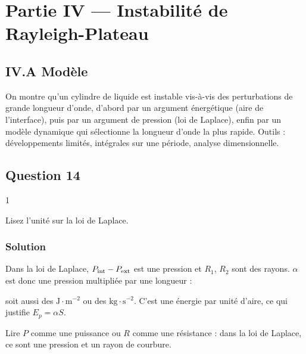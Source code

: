 \documentclass[11pt,a4paper]{article}
\newcommand{\equationajustee}[1]{%
  \sbox{\boiteequation}{$\displaystyle #1$}%
  \ifdim\wd\boiteequation>\linewidth
    \[\resizebox{\linewidth}{!}{\usebox{\boiteequation}}\]%
  \else
    \[#1\]%
  \fi}
\begin{document}
\hypertarget{partie-iv-instabilituxe9-de-rayleigh-plateau}{%
\section{Partie IV --- Instabilité de Rayleigh-Plateau}\label{partie-iv-instabilituxe9-de-rayleigh-plateau}}

\hypertarget{iv.a-moduxe8le}{%
\subsection{IV.A Modèle}\label{iv.a-moduxe8le}}

On montre qu'un cylindre de liquide est instable vis-à-vis des perturbations de grande longueur d'onde, d'abord par un argument énergétique (aire de l'interface), puis par un argument de pression (loi de Laplace), enfin par un modèle dynamique qui sélectionne la longueur d'onde la plus rapide. Outils : développements limités, intégrales sur une période, analyse dimensionnelle.

\hypertarget{question-14}{%
\subsection{Question 14}\label{question-14}}

\begin{indication}{1}

Lisez l'unité sur la loi de Laplace.

\end{indication}

\hypertarget{solution-13}{%
\subsubsection{Solution}\label{solution-13}}

Dans la loi de Laplace, \(P_{\rm int}-P_{\rm ext}\) est une pression et \(R_1\), \(R_2\) sont des rayons. \(\alpha\) est donc une pression multipliée par une longueur :

\equationajustee{\boxed{[\alpha]=\mathrm{N\cdot m^{-1}}}}

soit aussi des \(\mathrm{J\cdot m^{-2}}\) ou des \(\mathrm{kg\cdot s^{-2}}\). C'est une énergie par unité d'aire, ce qui justifie \(E_p=\alpha S\).

\begin{piege}

Lire \(P\) comme une puissance ou \(R\) comme une résistance : dans la loi de Laplace, ce sont une pression et un rayon de courbure.

\end{piege}
\end{document}
